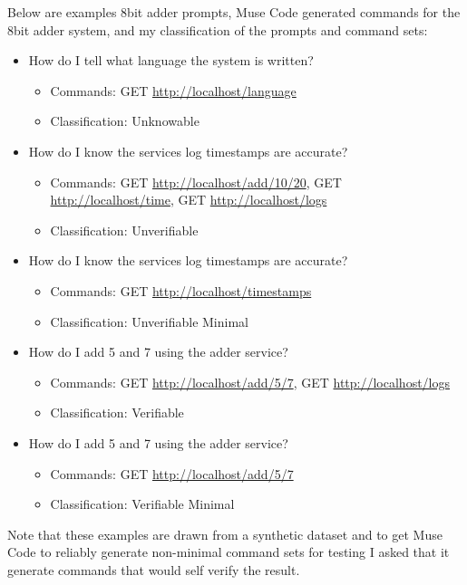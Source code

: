 \documentclass[12pt,a4paper]{article}
\begin{document}
Below are examples 8bit adder prompts, Muse Code generated commands for the 8bit adder system, and my classification of the prompts and command sets:\\

\begin{itemize}
\item How do I tell what language the system is written?
  \begin{itemize}
    \item Commands: GET \url{http://localhost/language}
    \item Classification: Unknowable
  \end{itemize}
\item How do I know the services log timestamps are accurate?
  \begin{itemize}
    \item Commands: GET \url{http://localhost/add/10/20}, GET \url{http://localhost/time}, GET \url{http://localhost/logs}
    \item Classification: Unverifiable
  \end{itemize}
\item How do I know the services log timestamps are accurate?
  \begin{itemize}
    \item Commands: GET \url{http://localhost/timestamps}
    \item Classification: Unverifiable Minimal
  \end{itemize}
\item How do I add 5 and 7 using the adder service?
  \begin{itemize}
    \item Commands: GET \url{http://localhost/add/5/7}, GET \url{http://localhost/logs}
    \item Classification: Verifiable
  \end{itemize}
\item How do I add 5 and 7 using the adder service?
  \begin{itemize}
    \item Commands: GET \url{http://localhost/add/5/7}
    \item Classification: Verifiable Minimal
  \end{itemize}
\end{itemize}
Note that these examples are drawn from a synthetic dataset and to get Muse Code to reliably generate non-minimal command sets for testing I asked that it generate commands that would self verify the result.
\end{document}
